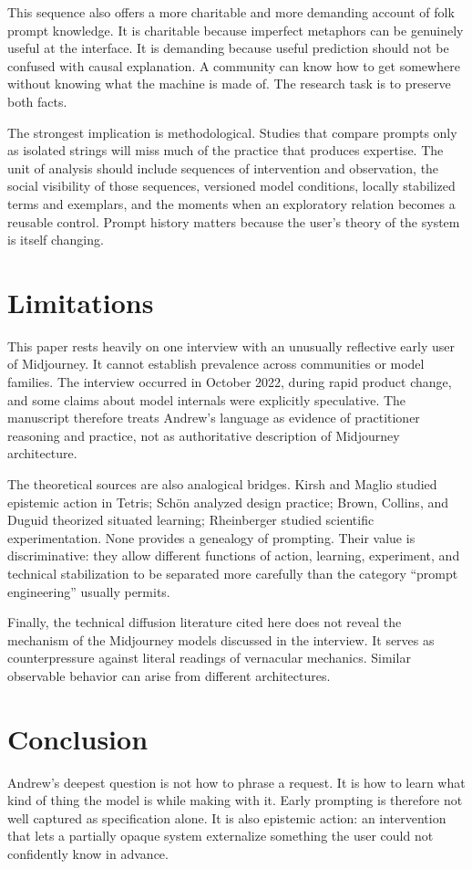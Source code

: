 \documentclass[11pt]{article}
\begin{document}
This sequence also offers a more charitable and more demanding account of folk prompt knowledge. It is charitable because imperfect metaphors can be genuinely useful at the interface. It is demanding because useful prediction should not be confused with causal explanation. A community can know how to get somewhere without knowing what the machine is made of. The research task is to preserve both facts.

The strongest implication is methodological. Studies that compare prompts only as isolated strings will miss much of the practice that produces expertise. The unit of analysis should include sequences of intervention and observation, the social visibility of those sequences, versioned model conditions, locally stabilized terms and exemplars, and the moments when an exploratory relation becomes a reusable control. Prompt history matters because the user's theory of the system is itself changing.

\section{Limitations}
This paper rests heavily on one interview with an unusually reflective early user of Midjourney. It cannot establish prevalence across communities or model families. The interview occurred in October 2022, during rapid product change, and some claims about model internals were explicitly speculative. The manuscript therefore treats Andrew's language as evidence of practitioner reasoning and practice, not as authoritative description of Midjourney architecture.

The theoretical sources are also analogical bridges. Kirsh and Maglio studied epistemic action in Tetris; Schön analyzed design practice; Brown, Collins, and Duguid theorized situated learning; Rheinberger studied scientific experimentation. None provides a genealogy of prompting. Their value is discriminative: they allow different functions of action, learning, experiment, and technical stabilization to be separated more carefully than the category ``prompt engineering'' usually permits.

Finally, the technical diffusion literature cited here does not reveal the mechanism of the Midjourney models discussed in the interview. It serves as counterpressure against literal readings of vernacular mechanics. Similar observable behavior can arise from different architectures.

\section{Conclusion}
Andrew's deepest question is not how to phrase a request. It is how to learn what kind of thing the model is while making with it. Early prompting is therefore not well captured as specification alone. It is also epistemic action: an intervention that lets a partially opaque system externalize something the user could not confidently know in advance.
\end{document}
